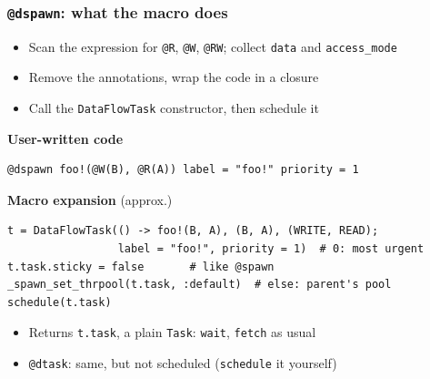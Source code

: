 \documentclass{beamer}
\begin{document}
\begin{frame}[fragile]
	\frametitle{\texttt{@dspawn}: what the macro does}
	\begin{itemize}
		\item Scan the expression for \texttt{@R}, \texttt{@W}, \texttt{@RW}; collect \texttt{data} and \texttt{access\_mode}
		\item Remove the annotations, wrap the code in a closure
		\item Call the \texttt{DataFlowTask} constructor, then schedule it
	\end{itemize}

	\vfill
	\textbf{User-written code}
	\begin{verbatim}
@dspawn foo!(@W(B), @R(A)) label = "foo!" priority = 1
	\end{verbatim}

	\bigskip
	\textbf{Macro expansion} (approx.)
	\begin{verbatim}
t = DataFlowTask(() -> foo!(B, A), (B, A), (WRITE, READ);
                 label = "foo!", priority = 1)  # 0: most urgent
t.task.sticky = false       # like @spawn
_spawn_set_thrpool(t.task, :default)  # else: parent's pool
schedule(t.task)
	\end{verbatim}

	\vfill
	\begin{itemize}
		\item Returns \texttt{t.task}, a plain \texttt{Task}: \texttt{wait}, \texttt{fetch} as usual
		\item \texttt{@dtask}: same, but not scheduled (\texttt{schedule} it yourself)
	\end{itemize}

\end{frame}
\end{document}
